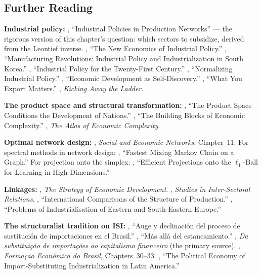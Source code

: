\documentclass[../structural_economics_book.tex]{subfiles}
\begin{document}
\subsection*{Further Reading}

\textbf{Industrial policy:} \citet{liu2019industrial}, ``Industrial Policies in Production Networks'' --- the rigorous version of this chapter's question: which sectors to subsidize, derived from the Leontief inverse. \citet*{juhasz2024new}, ``The New Economics of Industrial Policy.'' \citet{lane2025manufacturing}, ``Manufacturing Revolutions: Industrial Policy and Industrialization in South Korea.'' \citet{rodrik2004industrial}, ``Industrial Policy for the Twenty-First Century.'' \citet{rodrik2008normalizing}, ``Normalizing Industrial Policy.'' \citet{hausmann2003economic}, ``Economic Development as Self-Discovery.'' \citet*{hausmann2007what}, ``What You Export Matters.'' \citet{chang2002kicking}, \textit{Kicking Away the Ladder}.

\textbf{The product space and structural transformation:} \citet{hidalgo2007product}, ``The Product Space Conditions the Development of Nations.'' \citet{hidalgo2009building}, ``The Building Blocks of Economic Complexity.'' \citet{hausmann2014atlas}, \textit{The Atlas of Economic Complexity}.

\textbf{Optimal network design:} \citet{jackson2008social}, \textit{Social and Economic Networks}, Chapter~11. For spectral methods in network design: \citet*{boyd2004fastest}, ``Fastest Mixing Markov Chain on a Graph.'' For projection onto the simplex: \citet*{duchi2008efficient}, ``Efficient Projections onto the $\ell_1$-Ball for Learning in High Dimensions.''

\textbf{Linkages:} \citet{hirschman1958strategy}, \textit{The Strategy of Economic Development}. \citet{rasmussen1956studies}, \textit{Studies in Inter-Sectoral Relations}. \citet{chenery1958international}, ``International Comparisons of the Structure of Production.'' \citet{rosensteinrodan1943problems}, ``Problems of Industrialisation of Eastern and South-Eastern Europe.''

\textbf{The structuralist tradition on ISI:} \citet{tavares1964auge}, ``Auge y declinaci\'{o}n del proceso de sustituci\'{o}n de importaciones en el Brasil.'' \citet{tavares1971mas}, ``M\'{a}s all\'{a} del estancamiento.'' \citet{tavares1972substituicao}, \textit{Da substitui\c{c}\~{a}o de importa\c{c}\~{o}es ao capitalismo financeiro} (the primary source). \citet{furtado1959formacao}, \textit{Forma\c{c}\~{a}o Econ\^{o}mica do Brasil}, Chapters~30--33. \citet{hirschman1968political}, ``The Political Economy of Import-Substituting Industrialization in Latin America.''
\end{document}
